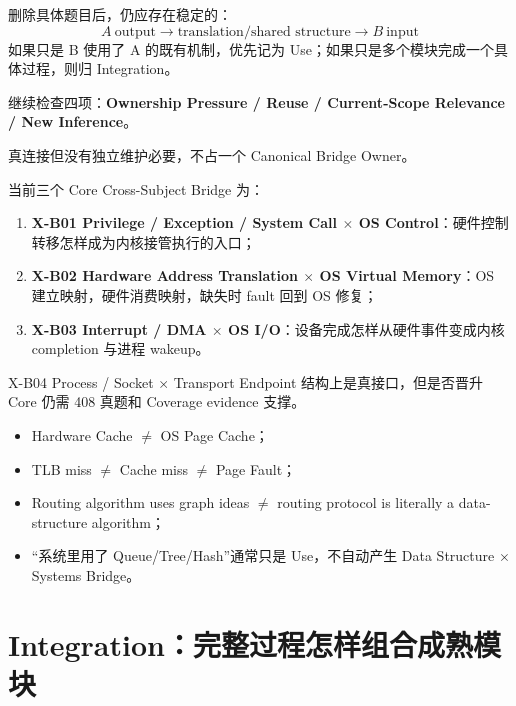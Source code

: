 \documentclass[11pt,a4paper]{ctexart}
\newcommand{\kw}[1]{\textbf{#1}}
\begin{document}
\begin{bridgebox}
删除具体题目后，仍应存在稳定的：
\[
\boxed{
A\ \text{output}
\to \text{translation/shared structure}
\to B\ \text{input}
}
\]
如果只是 B 使用了 A 的既有机制，优先记为 Use；如果只是多个模块完成一个具体过程，则归 Integration。
\end{bridgebox}

\begin{bridgebox}
继续检查四项：\kw{Ownership Pressure / Reuse / Current-Scope Relevance / New Inference}。

真连接但没有独立维护必要，不占一个 Canonical Bridge Owner。
\end{bridgebox}

当前三个 Core Cross-Subject Bridge 为：

\begin{enumerate}
\item \kw{X-B01 Privilege / Exception / System Call $\times$ OS Control}：硬件控制转移怎样成为内核接管执行的入口；
\item \kw{X-B02 Hardware Address Translation $\times$ OS Virtual Memory}：OS 建立映射，硬件消费映射，缺失时 fault 回到 OS 修复；
\item \kw{X-B03 Interrupt / DMA $\times$ OS I/O}：设备完成怎样从硬件事件变成内核 completion 与进程 wakeup。
\end{enumerate}

X-B04 Process / Socket $\times$ Transport Endpoint 结构上是真接口，但是否晋升 Core 仍需 408 真题和 Coverage evidence 支撑。

\begin{warn}
\begin{itemize}
\item Hardware Cache $\neq$ OS Page Cache；
\item TLB miss $\neq$ Cache miss $\neq$ Page Fault；
\item Routing algorithm uses graph ideas $\neq$ routing protocol is literally a data-structure algorithm；
\item “系统里用了 Queue/Tree/Hash”通常只是 Use，不自动产生 Data Structure $\times$ Systems Bridge。
\end{itemize}
\end{warn}

\section{Integration：完整过程怎样组合成熟模块}
\end{document}
